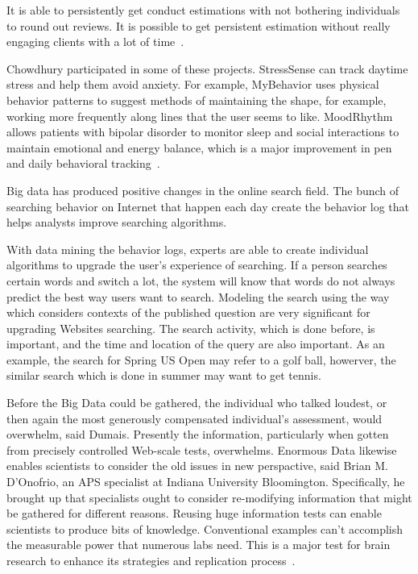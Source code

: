 It is able to persistently get conduct estimations with not 
bothering individuals to round out reviews. 
It is possible to get persistent estimation without really 
engaging clients with a lot of time~\cite{hid515-00}.

Chowdhury participated in some of these projects. StressSense can 
track 
daytime stress and help them avoid anxiety. For example, MyBehavior uses 
physical behavior patterns to suggest methods of maintaining the shape, for 
example, working more frequently along lines that the user seems to like. 
MoodRhythm allows patients with bipolar disorder to monitor 
sleep and social 
interactions to maintain emotional and energy balance, which is a major 
improvement in pen and daily behavioral tracking~\cite{hid515-00}. 

Big data has produced positive changes in the online search field. 
The bunch of searching behavior on Internet 
that happen each day create the behavior log that helps
analysts improve searching algorithms. 

With data mining the behavior logs, experts are able to create 
individual algorithms 
to upgrade the user's experience of searching. If a person searches
certain words and switch a lot, the system will know that words
 do not always predict the best way users want to search. 
Modeling the search using the way 
which considers contexts of the published question are very 
significant for 
upgrading Websites searching. 
The search activity, which is done before, is important, and the 
time and location of the query are also important. As an example, 
the search for Spring US Open may refer to a golf ball, 
howerver, the similar 
search which is done in summer may want to get tennis.

Before the Big Data could be gathered, the individual who talked 
loudest, or then again the most generously compensated individual's
 assessment, would overwhelm, said Dumais. Presently the 
information, particularly when gotten from precisely controlled
 Web-scale tests, overwhelms. Enormous Data likewise
 enables scientists to consider the old issues in new perspactive, said 
Brian M. D'Onofrio, an APS specialist at Indiana University 
Bloomington. Specifically, he brought up that specialists ought to
 consider re-modifying information that might be gathered for 
different reasons. Reusing huge information tests can enable 
scientists to produce bits of knowledge. Conventional examples 
can't accomplish the measurable power that numerous labs need. 
This is a major test for brain research to enhance its strategies 
and replication process~\cite{hid515-00}.

